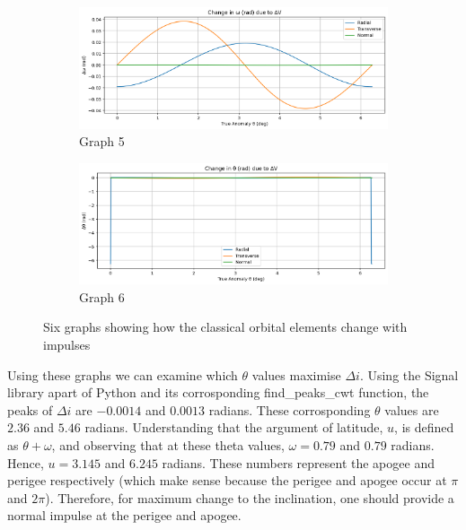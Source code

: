 \documentclass[12pt,twocolumn]{article}  %
\begin{document}
\begin{figure}[H]
        \begin{subfigure}[t]{0.45\textwidth}
            \centering
            \includegraphics[width=\linewidth]{Images/del_lomega.png}
            \caption{Graph 5}
        \end{subfigure}
        \hspace{0.05\textwidth}
        \begin{subfigure}[t]{0.45\textwidth}
            \centering
            \includegraphics[width=\linewidth]{Images/del_theta.png}
            \caption{Graph 6}
        \end{subfigure}
    
        \caption{Six graphs showing how the classical orbital elements change with impulses}
        \label{fig:six_graphs}
    \end{figure}
Using these graphs we can examine which $\theta$ values maximise $\Delta i$. Using the Signal library apart of Python
and its corrosponding find\_peaks\_cwt function, the peaks of $\Delta i$ are  $-0.0014$ and $0.0013$ radians.
These corrosponding $\theta$ values are $2.36$ and $5.46$ radians. Understanding that the argument of latitude, $u$,
is defined as $\theta + \omega$, and observing that at these theta values, $\omega = 0.79$ and $0.79$ radians.
Hence, $u = 3.145$ and $6.245$ radians. These numbers represent the apogee and perigee respectively (which make sense because the perigee and apogee 
occur at $\pi$ and $2\pi$). Therefore, for maximum change to the inclination, one should provide a normal impulse at the perigee and apogee.
\end{document}
